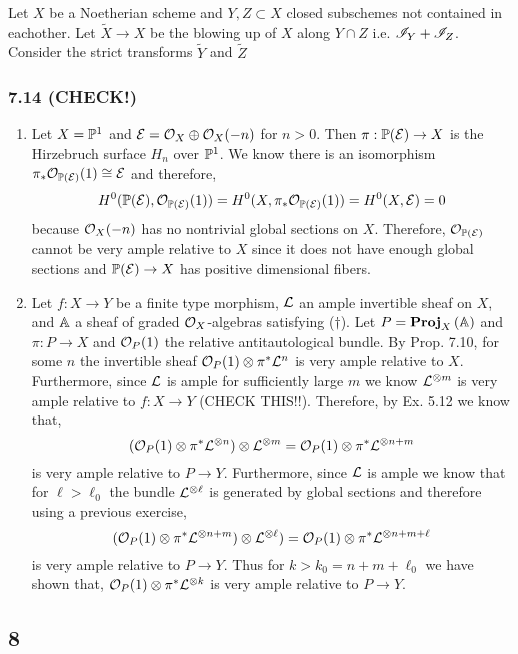 \documentclass[12pt]{article}
\begin{document}
Let $X$ be a Noetherian scheme and $Y,Z \subset X$ closed subschemes not contained in eachother. Let $\tilde{X} \to X$ be the blowing up of $X$ along $Y \cap Z$ i.e. $\I_Y + \I_Z$. Consider the strict transforms $\tilde{Y}$ and $\tilde{Z}$ 


\subsubsection{7.14 (CHECK!)}

\begin{enumerate}
\item Let $X = \P^1$ and $\E = \struct{X} \oplus \struct{X}(-n)$ for $n > 0$. Then $\pi : \P(\E) \to X$ is the Hirzebruch surface $H_n$ over $\P^1$. We know there is an isomorphism $\pi_* \struct{\P(\E)}(1) \cong \E$ and therefore,
\[ H^0(\P(\E), \struct{\P(\E)}(1)) = H^0(X, \pi_* \struct{\P(\E)}(1)) = H^0(X, \E) = 0 \]
because $\struct{X}(-n)$ has no nontrivial global sections on $X$. Therefore, $\struct{\P(\E)}$ cannot be very ample relative to $X$ since it does not have enough global sections and $\P(\E) \to X$ has positive dimensional fibers.

\item Let $f : X \to Y$ be a finite type morphism, $\L$ an ample invertible sheaf on $X$, and $\A$ a sheaf of graded $\struct{X}$-algebras satisfying ($\dagger$). Let $P = \rProj{X}{\A}$ and $\pi : P \to X$ and $\struct{P}(1)$ the relative antitautological bundle. By Prop. 7.10, for some $n$ the invertible sheaf $\struct{P}(1) \otimes \pi^* \L^n$ is very ample relative to $X$. Furthermore, since $\L$ is ample for sufficiently large $m$ we know $\L^{\otimes m}$ is very ample relative to $f : X \to Y$ (CHECK THIS!!). Therefore, by Ex. 5.12 we know that,
\[ (\struct{P}(1) \otimes \pi^* \L^{\otimes n}) \otimes \L^{\otimes m} = \struct{P}(1) \otimes \pi^* \L^{\otimes n + m} \]
is very ample relative to $P \to Y$. Furthermore, since $\L$ is ample we know that for $\ell > \ell_0$ the bundle $\L^{\otimes \ell}$ is generated by global sections and therefore using a previous exercise,
\[ (\struct{P}(1) \otimes \pi^* \L^{\otimes n + m}) \otimes \L^{\otimes \ell}) = \struct{P}(1) \otimes \pi^* \L^{\otimes n + m + \ell} \]
is very ample relative to $P \to Y$. Thus for $k > k_0 = n + m + \ell_0$ we have shown that, $\struct{P}(1) \otimes \pi^* \L^{\otimes k}$ is very ample relative to $P \to Y$.
\end{enumerate}

\subsection{8}
\end{document}
